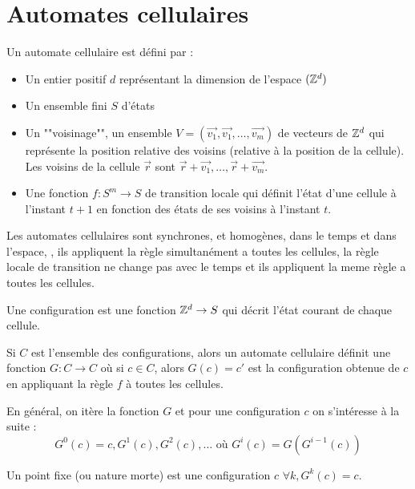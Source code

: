 \section{Automates cellulaires}

\begin{definition}
	Un automate cellulaire est défini par :
	\begin{itemize}
		\item Un entier positif $d$ représentant la dimension de l'espace $(\mathbb{Z}^d)$
		\item Un ensemble fini $S$ d'états
		\item Un ""voisinage"", \ie un ensemble $V = (\vec{v_1},  \vec{v_1}, \ldots ,\vec{v_m})$ de vecteurs de $\mathbb{Z}^d$
		      qui représente la position relative des voisins (relative à la position de la cellule). Les voisins de la
		      cellule $\vec r$ sont $\vec r + \vec {v_1},  \ldots , \vec r + \vec {v_m}$.
		\item Une fonction $f : S ^ m \to S$ de transition locale qui définit l'état d'une cellule à l'instant $t + 1$
		      en fonction des états de ses voisins à l'instant $t$.
	\end{itemize}
\end{definition}

Les automates cellulaires sont synchrones, et homogènes, dans le temps et dans l'espace, \ie,
ils appliquent la règle simultanément a toutes les cellules,
la règle locale de transition ne change pas avec le temps et
ils appliquent la meme règle a toutes les cellules.

\begin{definition}
	Une configuration est une fonction $\mathbb{Z} ^ d \to S$ qui décrit l'état courant de chaque cellule.

	Si $C$ est l'ensemble des configurations, alors un automate cellulaire définit une fonction $G: C \to C$ où si $c \in C$, alors
	$G(c) = c'$ est la configuration obtenue de $c$ en appliquant la règle $f$ à toutes les cellules.

	En général, on itère la fonction $G$ et pour une configuration $c$ on s'intéresse à la suite :
	$$ G^0 (c) = c, G^1 (c), G^2 (c), \ldots \text{ où } G^i (c) = G ( G^{i - 1 }(c))$$
\end{definition}

\begin{definition}
	Un point fixe (ou nature morte) est une configuration $c$ \tlq $\forall k, G^k(c) = c$.
\end{definition}


